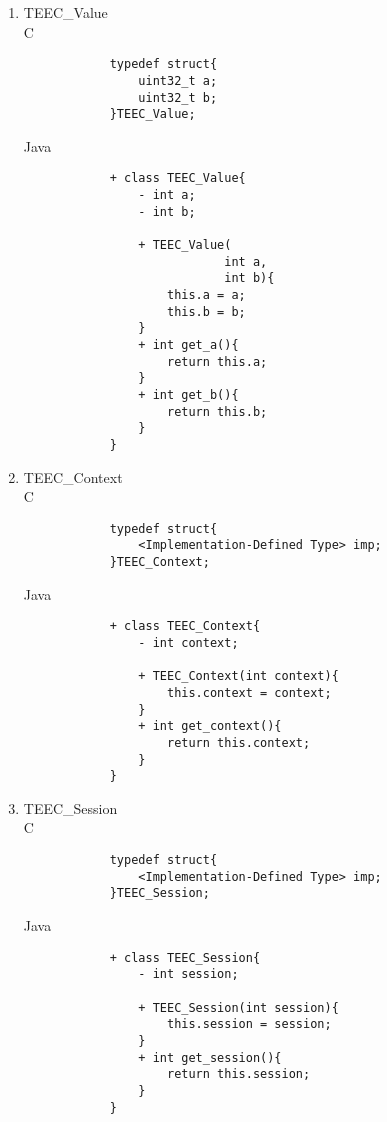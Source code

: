 \documentclass{cseminar}
\begin{document}
\begin{enumerate}
			Java
			\begin{lstlisting}
			+ class TEEC_RegisteredMemoryReference{
				- TEEC_SharedMemory parent;
				- int				size;
				- int				offset;
				
				+ TEEC_RegisteredMemoryReference(
								TEEC_SharedMemory parent,
								int size,
								int offset){
					this.parent = parent;
					this.size 	= size;
					this.offset = offset;				
				}
				+ TEEC_SharedMemory get_parent(){
					return this.parent;				
				}
				+ int get_size(){
					return this.size;				
				}
				+ int get_offset(){
					return this.offset;				
				}
			}
			\end{lstlisting}
	
	\item TEEC\_Value
			\\C
			\begin{lstlisting}
			typedef struct{
				uint32_t a;
				uint32_t b;
			}TEEC_Value;
			\end{lstlisting}
			
			Java
			\begin{lstlisting}
			+ class TEEC_Value{
				- int a;
				- int b;
				
				+ TEEC_Value(
							int a,
							int b){
					this.a = a;
					this.b = b;							
				}
				+ int get_a(){
					return this.a;				
				}
				+ int get_b(){
					return this.b;				
				}
			}
			\end{lstlisting}
			
	\item TEEC\_Context
			\\C
			\begin{lstlisting}
			typedef struct{
				<Implementation-Defined Type> imp;
			}TEEC_Context;
			\end{lstlisting}
			
			Java
			\begin{lstlisting}
			+ class TEEC_Context{
				- int context;
				
				+ TEEC_Context(int context){
					this.context = context;				
				}
				+ int get_context(){
					return this.context;				
				}
			}
			\end{lstlisting}
			
	\item TEEC\_Session
			\\C
			\begin{lstlisting}
			typedef struct{
				<Implementation-Defined Type> imp;
			}TEEC_Session;
			\end{lstlisting}
			
			Java
			\begin{lstlisting}
			+ class TEEC_Session{
				- int session;
				
				+ TEEC_Session(int session){
					this.session = session;				
				}
				+ int get_session(){
					return this.session;				
				}
			}
			\end{lstlisting}
\end{enumerate}
\end{document}
